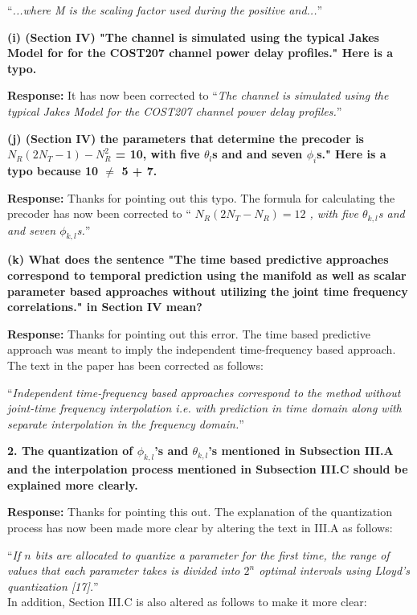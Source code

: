 \documentclass[12pt]{letter}
\begin{document}
``\emph{...where M is the scaling factor used during the positive and...}''


\textbf{(i) (Section IV) "The channel is simulated using the typical Jakes Model for for the COST207 channel power delay profiles." Here is a typo.}

\textbf{Response:} It has now been corrected to ``\emph{The channel is simulated using the typical Jakes Model for the COST207 channel power delay profiles.}''

\textbf{(j) (Section IV) the parameters that determine the precoder is $N_R (2N_T - 1) - N^{2}_R$ = 10, with five $\theta_l$s and and seven $\phi_i$s." Here is a typo because 10 $\neq$ 5 + 7.}

\textbf{Response:} Thanks for pointing out this typo. The formula for
calculating the precoder has now been corrected to ``\emph{
  $N_{R}(2N_{T} - N_R) = 12$ , with five $\theta_{k,l}$s and and seven
  $\phi_{k,l}$s.}''

\textbf{(k) What does the sentence "The time based predictive approaches correspond to temporal prediction using the manifold as well as scalar parameter based approaches without utilizing the joint time frequency correlations." in Section IV mean?}

\textbf{Response:} Thanks for pointing out this error. The time based
predictive approach was meant to imply the independent time-frequency based
approach. The text in the paper has been corrected as follows:


``\emph{Independent time-frequency based approaches correspond to the
  method without joint-time frequency interpolation i.e. with
  prediction in time domain along with separate interpolation in the frequency
  domain.}''

\textbf{2. The quantization of $\phi_{k,l}$'s and $\theta_{k,l}$'s mentioned in Subsection III.A and the interpolation
process mentioned in Subsection III.C should be explained more clearly.}

\textbf{Response:}
Thanks for pointing this out. The explanation of the quantization
process has now been made more  clear by altering the text in III.A as
follows:

``\emph{If $n$ bits are allocated to quantize a parameter
for the first time, the range of values that each parameter takes is
divided into $2^n$ optimal intervals using Lloyd's
quantization [17].}''\\

In addition, Section III.C is also altered as follows to make it more
clear:
\end{document}
